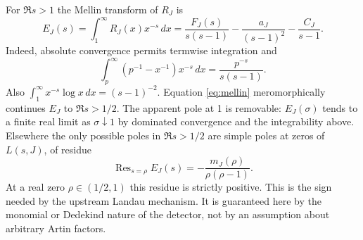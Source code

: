 \documentclass[11pt,letterpaper]{article}
\theoremstyle{remark}\newtheorem{remark}[theorem]{Remark}
\begin{document}
For $\Re s>1$ the Mellin transform of $R_J$ is
\begin{equation}\label{eq:mellin}
 E_J(s)=\int_1^\infty R_J(x)x^{-s}\,dx
 =\frac{F_J(s)}{s(s-1)}-\frac{a_J}{(s-1)^2}-\frac{C_J}{s-1}.
\end{equation}
Indeed, absolute convergence permits termwise integration and
\[
 \int_p^\infty (p^{-1}-x^{-1})x^{-s}\,dx=\frac{p^{-s}}{s(s-1)}.
\]
Also $\int_1^\infty x^{-s}\log x\,dx=(s-1)^{-2}$. Equation \eqref{eq:mellin} meromorphically continues $E_J$ to $\Re s>1/2$. The apparent pole at 1 is removable: $E_J(\sigma)$ tends to a finite real limit as $\sigma\downarrow1$ by dominated convergence and the integrability above. Elsewhere the only possible poles in $\Re s>1/2$ are simple poles at zeros of $L(s,J)$, of residue
\begin{equation}\label{eq:res}
 \operatorname{Res}_{s=\rho}E_J(s)=-\frac{m_J(\rho)}{\rho(\rho-1)}.
\end{equation}
At a real zero $\rho\in(1/2,1)$ this residue is strictly positive. This is the sign needed by the upstream Landau mechanism. It is guaranteed here by the monomial or Dedekind nature of the detector, not by an assumption about arbitrary Artin factors.
\end{document}
